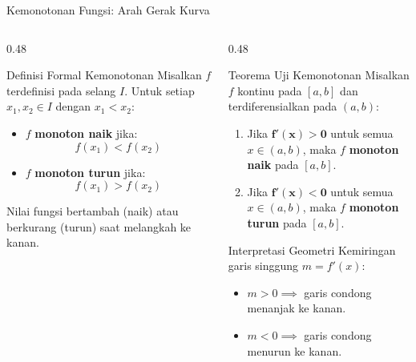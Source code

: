 \documentclass[aspectratio=169,10pt]{beamer}
\begin{document}
\begin{frame}{Kemonotonan Fungsi: Arah Gerak Kurva}
    \begin{columns}[T]
        \begin{column}{0.48\textwidth}
            \begin{block}{Definisi Formal Kemonotonan}
                Misalkan $f$ terdefinisi pada selang $I$. Untuk setiap $x_1, x_2 \in I$ dengan $x_1 < x_2$:
                \begin{itemize}
                    \item $f$ \textbf{monoton naik} jika:
                    \[
                        f(x_1) < f(x_2)
                    \]
                    \item $f$ \textbf{monoton turun} jika:
                    \[
                        f(x_1) > f(x_2)
                    \]
                \end{itemize}
                {\scriptsize \color{SoftGray} Nilai fungsi bertambah (naik) atau berkurang (turun) saat melangkah ke kanan.}
            \end{block}
        \end{column}

        \begin{column}{0.48\textwidth}
            \begin{exampleblock}{Teorema Uji Kemonotonan}
                Misalkan $f$ kontinu pada $[a, b]$ dan terdiferensialkan pada $(a, b)$:
                \begin{enumerate}
                    \item Jika $\mathbf{f'(x) > 0}$ untuk semua $x \in (a, b)$, maka $f$ \textbf{monoton naik} pada $[a, b]$.
                    \item Jika $\mathbf{f'(x) < 0}$ untuk semua $x \in (a, b)$, maka $f$ \textbf{monoton turun} pada $[a, b]$.
                \end{enumerate}
            \end{exampleblock}

            \begin{alertblock}{Interpretasi Geometri}
                Kemiringan garis singgung $m = f'(x)$:
                \begin{itemize}
                    \item $m > 0 \implies$ garis condong menanjak ke kanan.
                    \item $m < 0 \implies$ garis condong menurun ke kanan.
                \end{itemize}
            \end{alertblock}
        \end{column}
    \end{columns}
\end{frame}
\end{document}
